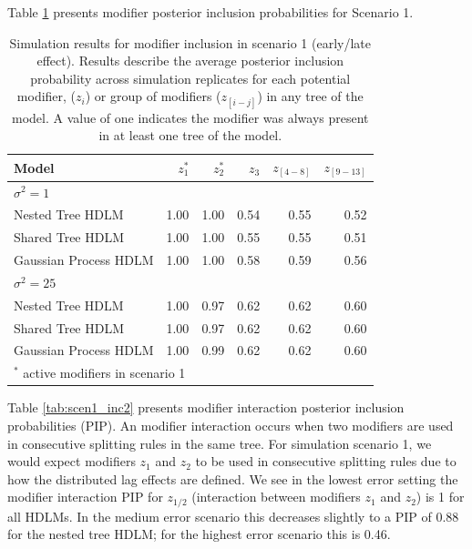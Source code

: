 \documentclass[12pt]{article}
\begin{document}
Table \ref{tab:scen1_inc} presents modifier posterior inclusion probabilities for Scenario 1.

\begin{table}[!ht]
 \footnotesize
    \centering
    \caption{Simulation results for modifier inclusion in scenario 1 (early/late effect). Results describe the average posterior inclusion probability across simulation replicates for each potential modifier, ($z_i$) or group of modifiers ($z_{[i-j]}$) in any tree of the model. A value of one indicates the modifier was always present in at least one tree of the model.}
    \label{tab:scen1_inc}
    \begin{tabular}{lrrrrr}
        \toprule[2pt]
        Model & $z_{1}^*$ & $z_{2}^*$ & $z_{3}$ & $z_{[4-8]}$ & $z_{[9-13]}$ \\
        
        
        \midrule
        \multicolumn{6}{l}{$\sigma^2=1$}\\
Nested Tree HDLM & 1.00 & 1.00 & 0.54 & 0.55 & 0.52\\
Shared Tree HDLM & 1.00 & 1.00 & 0.55 & 0.55 & 0.51\\
Gaussian Process HDLM & 1.00 & 1.00 & 0.58 & 0.59 & 0.56\\
        

        \midrule
        \multicolumn{6}{l}{$\sigma^2=25$}\\
Nested Tree HDLM & 1.00 & 0.97 & 0.62 & 0.62 & 0.60\\
Shared Tree HDLM & 1.00 & 0.97 & 0.62 & 0.62 & 0.60\\
Gaussian Process HDLM & 1.00 & 0.99 & 0.62 & 0.62 & 0.60\\

        \bottomrule[2pt]
        \multicolumn{6}{l}{$^*$ active modifiers in scenario 1}\\
    \end{tabular}
\end{table}



Table \ref{tab:scen1_inc2} presents modifier interaction posterior inclusion probabilities (PIP). An modifier interaction occurs when two modifiers are used in consecutive splitting rules in the same tree. For simulation scenario 1, we would expect modifiers $z_1$ and $z_2$ to be used in consecutive splitting rules due to how the distributed lag effects are defined. We see in the lowest error setting the modifier interaction PIP for $z_{1/2}$ (interaction between modifiers $z_1$ and $z_2$) is 1 for all HDLMs. In the medium error scenario this decreases slightly to a PIP of 0.88 for the nested tree HDLM; for the highest error scenario this is 0.46. 
\end{document}
